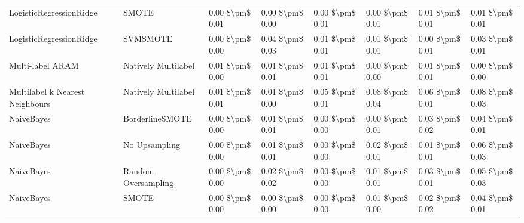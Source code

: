 \begin{tabular}{llllllll}
        LogisticRegressionRidge &                         SMOTE & 0.00 \$\textbackslash pm\$ 0.01 &           0.00 \$\textbackslash pm\$ 0.00 &       0.00 \$\textbackslash pm\$ 0.01 &        0.00 \$\textbackslash pm\$ 0.01 &                         0.01 \$\textbackslash pm\$ 0.01 &     0.01 \$\textbackslash pm\$ 0.01 \\
        LogisticRegressionRidge &                      SVMSMOTE & 0.00 \$\textbackslash pm\$ 0.00 &           0.04 \$\textbackslash pm\$ 0.03 &       0.01 \$\textbackslash pm\$ 0.01 &        0.01 \$\textbackslash pm\$ 0.01 &                         0.00 \$\textbackslash pm\$ 0.01 &     0.03 \$\textbackslash pm\$ 0.01 \\
               Multi-label ARAM &           Natively Multilabel & 0.01 \$\textbackslash pm\$ 0.00 &           0.01 \$\textbackslash pm\$ 0.01 &       0.01 \$\textbackslash pm\$ 0.01 &        0.00 \$\textbackslash pm\$ 0.00 &                         0.01 \$\textbackslash pm\$ 0.01 &     0.00 \$\textbackslash pm\$ 0.00 \\
Multilabel k Nearest Neighbours &           Natively Multilabel & 0.01 \$\textbackslash pm\$ 0.01 &           0.01 \$\textbackslash pm\$ 0.00 &       0.05 \$\textbackslash pm\$ 0.01 &        0.08 \$\textbackslash pm\$ 0.04 &                         0.06 \$\textbackslash pm\$ 0.01 &     0.08 \$\textbackslash pm\$ 0.03 \\
                     NaiveBayes &               BorderlineSMOTE & 0.00 \$\textbackslash pm\$ 0.00 &           0.01 \$\textbackslash pm\$ 0.01 &       0.00 \$\textbackslash pm\$ 0.00 &        0.00 \$\textbackslash pm\$ 0.01 &                         0.03 \$\textbackslash pm\$ 0.02 &     0.04 \$\textbackslash pm\$ 0.01 \\
                     NaiveBayes &                 No Upsampling & 0.00 \$\textbackslash pm\$ 0.00 &           0.01 \$\textbackslash pm\$ 0.01 &       0.00 \$\textbackslash pm\$ 0.00 &        0.02 \$\textbackslash pm\$ 0.01 &                         0.01 \$\textbackslash pm\$ 0.01 &     0.06 \$\textbackslash pm\$ 0.03 \\
                     NaiveBayes &           Random Oversampling & 0.00 \$\textbackslash pm\$ 0.00 &           0.02 \$\textbackslash pm\$ 0.02 &       0.00 \$\textbackslash pm\$ 0.00 &        0.01 \$\textbackslash pm\$ 0.01 &                         0.03 \$\textbackslash pm\$ 0.01 &     0.05 \$\textbackslash pm\$ 0.03 \\
                     NaiveBayes &                         SMOTE & 0.00 \$\textbackslash pm\$ 0.00 &           0.00 \$\textbackslash pm\$ 0.00 &       0.00 \$\textbackslash pm\$ 0.00 &        0.01 \$\textbackslash pm\$ 0.00 &                         0.02 \$\textbackslash pm\$ 0.02 &     0.04 \$\textbackslash pm\$ 0.01 \\

\end{tabular}
